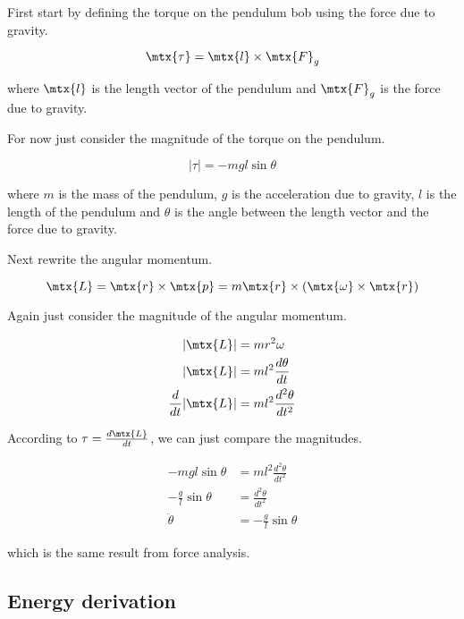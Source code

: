 First start by defining the torque on the pendulum bob using the force due to
gravity.

\begin{equation*}
  \mtx{\tau} = \mtx{l} \times \mtx{F}_g
\end{equation*}

where $\mtx{l}$ is the length vector of the pendulum and $\mtx{F}_g$ is the
force due to gravity.

For now just consider the magnitude of the torque on the pendulum.

\begin{equation*}
  \lvert\tau\rvert = -mgl\sin\theta
\end{equation*}

where $m$ is the mass of the pendulum, $g$ is the acceleration due to gravity,
$l$ is the length of the pendulum and $\theta$ is the angle between the length
vector and the force due to gravity.

Next rewrite the angular momentum.

\begin{equation*}
  \mtx{L} = \mtx{r} \times \mtx{p} =
    m\mtx{r} \times (\mtx{\omega} \times \mtx{r})
\end{equation*}

Again just consider the magnitude of the angular momentum.

\begin{align*}
  \lvert\mtx{L}\rvert &= mr^2\omega \\
  \lvert\mtx{L}\rvert &= ml^2 \frac{d\theta}{dt} \\
  \frac{d}{dt}\lvert\mtx{L}\rvert &= ml^2 \frac{d^2\theta}{dt^2}
\end{align*}

According to $\tau = \frac{d\mtx{L}}{dt}$, we can just compare the magnitudes.

\begin{align*}
  -mgl\sin\theta &= ml^2\frac{d^2\theta}{dt^2} \\
  -\frac{g}{l}\sin\theta &= \frac{d^2\theta}{dt^2} \\
  \ddot{\theta} &= -\frac{g}{l}\sin\theta
\end{align*}

which is the same result from force analysis.

\subsection{Energy derivation}


